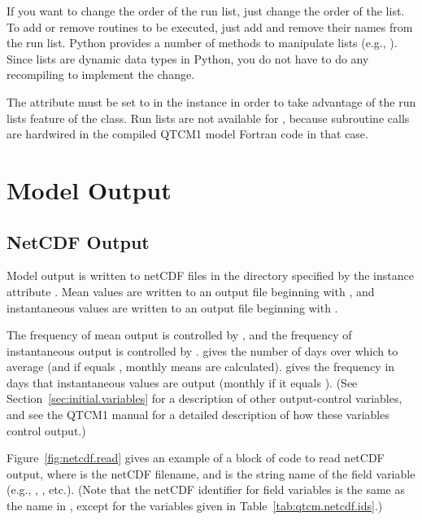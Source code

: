 If you want to change the order of the run list, just change the
order of the list.  To add or remove routines to be executed, just
add and remove their names from the run list.
Python provides a number of methods to manipulate
lists (e.g., ).  Since lists are dynamic data types
in Python, you do not have to do any recompiling to implement
the change.

The  attribute must be set to 
in the  instance in order to take advantage of the run
lists feature of the class.  Run lists are not available for
, because subroutine
calls are hardwired in the compiled QTCM1 model Fortran code in
that case.




\section{Model Output}			\label{sec:output.intro}

	\subsection{NetCDF Output}

Model output is written to netCDF files in the directory
specified by the  instance attribute .
Mean values are written to an output file beginning with
, and instantaneous values are written to an output
file beginning with .

The frequency of mean output is controlled by , and the
frequency of instantaneous output is controlled by .
 gives the number of days over which to average
(and if equals , monthly means are calculated).
 gives the frequency in days that instantaneous
values are output (monthly if it equals ).  (See
Section~\ref{sec:initial.variables} for a description of other
output-control variables, and see the QTCM1 manual \cite{Neelin/etal:2002}
for a detailed description of how these variables control output.)

Figure~\ref{fig:netcdf.read} gives an example of a block of code
to read netCDF output, where  is the netCDF filename, and
 is the string name of the field variable (e.g.,
, , etc.).
(Note that the netCDF identifier for field variables is the same as
the name in , except for the variables given in
Table~\ref{tab:qtcm.netcdf.ids}.)

